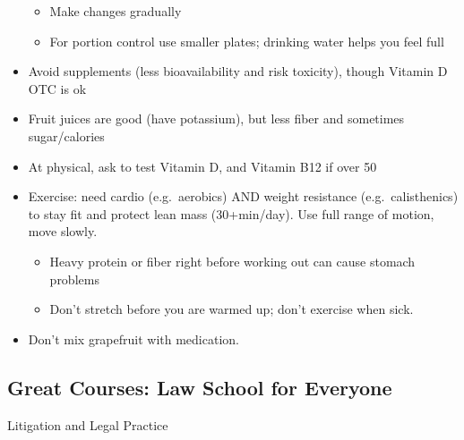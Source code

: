 \documentclass[
]{article}
\begin{document}
\begin{itemize}
  \begin{itemize}
  \item
    Make changes gradually
  \item
    For portion control use smaller plates; drinking water helps you
    feel full
  \end{itemize}
\item
  Avoid supplements (less bioavailability and risk toxicity), though
  Vitamin D OTC is ok
\item
  Fruit juices are good (have potassium), but less fiber and sometimes
  sugar/calories
\item
  At physical, ask to test Vitamin D, and Vitamin B12 if over 50
\item
  Exercise: need cardio (e.g.~aerobics) AND weight resistance
  (e.g.~calisthenics) to stay fit and protect lean mass (30+min/day).
  Use full range of motion, move slowly.

  \begin{itemize}
  \item
    Heavy protein or fiber right before working out can cause stomach
    problems
  \item
    Don't stretch before you are warmed up; don't exercise when sick.
  \end{itemize}
\item
  Don't mix grapefruit with medication.
\end{itemize}

\hypertarget{great-courses-law-school-for-everyone}{%
\subsection{Great Courses: Law School for
Everyone}\label{great-courses-law-school-for-everyone}}

Litigation and Legal Practice
\end{document}
